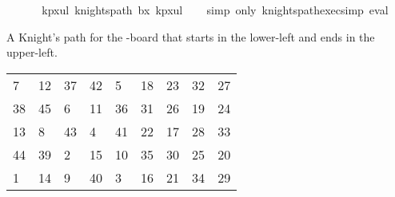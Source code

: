 \begin{isabellebody}
\ \ {\isacharbrackleft}{\kern0pt}{}{}{\isacharcomma}{\kern0pt}{}{}{\isacharcomma}{\kern0pt}{}{\isacharcomma}{\kern0pt}{}{}{\isacharcomma}{\kern0pt}{}{}{\isacharcomma}{\kern0pt}{}{}{\isacharcomma}{\kern0pt}{}{\isacharbrackright}{\kern0pt}{\isacharcomma}{\kern0pt}\isanewline
\ \ {\isacharbrackleft}{\kern0pt}{}{\isacharcomma}{\kern0pt}{}{}{\isacharcomma}{\kern0pt}{}{}{\isacharcomma}{\kern0pt}{}{}{\isacharcomma}{\kern0pt}{}{\isacharcomma}{\kern0pt}{}{}{\isacharcomma}{\kern0pt}{}{}{\isacharbrackright}{\kern0pt}{\isacharbrackright}{\kern0pt}{\isacharparenright}{\kern0pt}{\isachardoublequoteclose}\isanewline
{}\isamarkupfalse%
\ kp{\isacharunderscore}{\kern0pt}{}x{}{\isacharunderscore}{\kern0pt}ul{\isacharcolon}{\kern0pt}\ {\isachardoublequoteopen}knights{\isacharunderscore}{\kern0pt}path\ b{}x{}\ kp{}x{}ul{\isachardoublequoteclose}\isanewline
%
\isadelimproof
\ \ %
\endisadelimproof
%
\isatagproof
{}\isamarkupfalse%
\ {\isacharparenleft}{\kern0pt}simp\ only{\isacharcolon}{\kern0pt}\ knights{\isacharunderscore}{\kern0pt}path{\isacharunderscore}{\kern0pt}exec{\isacharunderscore}{\kern0pt}simp{\isacharparenright}{\kern0pt}\ eval%
\endisatagproof
{\isafoldproof}%
%
\isadelimproof
%
\endisadelimproof
%
\begin{isamarkuptext}%
A Knight's path for the -board that starts in the lower-left and ends in the 
upper-left.
  \begin{table}[H]
    \begin{tabular}{lllllllll}
       7 & 12 & 37 & 42 &  5 & 18 & 23 & 32 & 27 \\
      38 & 45 &  6 & 11 & 36 & 31 & 26 & 19 & 24 \\
      13 &  8 & 43 &  4 & 41 & 22 & 17 & 28 & 33 \\
      44 & 39 &  2 & 15 & 10 & 35 & 30 & 25 & 20 \\
       1 & 14 &  9 & 40 &  3 & 16 & 21 & 34 & 29
    \end{tabular}
  \end{table}%
\end{isamarkuptext}\isamarkuptrue%
\isamarkupfalse%

\end{isabellebody}

